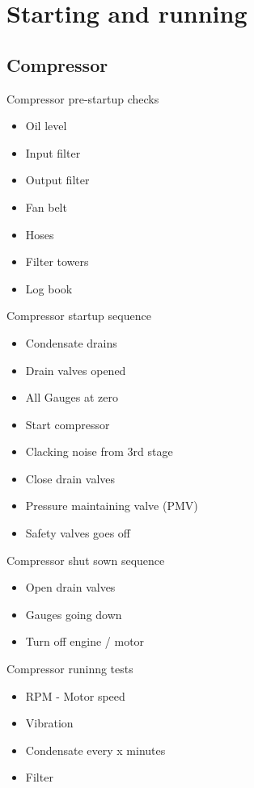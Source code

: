 \documentclass[aspectratio=1610,english,12pt]{beamer}
\begin{document}
\section{Starting and running}

\subsection{Compressor}
\begin{frame}{Compressor pre-startup checks}
	\begin{itemize}
		\item Oil level
		\item Input filter
		\item Output filter
		\item Fan belt
		\item Hoses
		\item Filter towers
		\item Log book
	\end{itemize}
\end{frame}

\begin{frame}{Compressor startup sequence}
    \begin{itemize}
    	\item Condensate drains
    	\item Drain valves opened
    	\item All Gauges at zero
    	\item Start compressor
    	\item Clacking noise from 3rd stage
    	\item Close drain valves
    	\item Pressure maintaining valve (PMV)
    	\item Safety valves goes off
    \end{itemize}
\end{frame}

\begin{frame}{Compressor shut sown sequence}
	\begin{itemize}
		\item Open drain valves
		\item Gauges going down
		\item Turn off engine / motor
	\end{itemize}
\end{frame}

\begin{frame}{Compressor runinng tests}
    \begin{itemize}
    	\item RPM - Motor speed
    	\item Vibration
    	\item Condensate every x minutes
    	\item Filter
    \end{itemize}
\end{frame}
\end{document}
